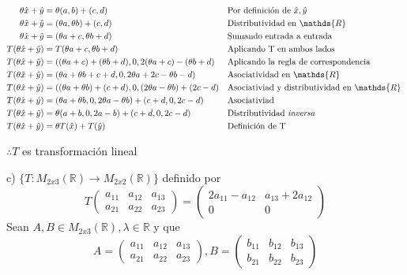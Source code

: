 \documentclass[letterpaper]{article}
\newcommand{\R}{\mathds{R}}
\renewcommand{\*}{\cdot}
\theoremstyle{definition}
\begin{document}
	\begin{align*}
		\theta \hat{x} + \hat{y} &= \theta(a,b) + (c,d) &&\text{Por definición de $ \hat{x}, \hat{y} $}\\
		\theta \hat{x} + \hat{y} &= (\theta a,\theta b) + (c,d) &&\text{Distributividad en $ \R $ }\\
		\theta \hat{x} + \hat{y} &= (\theta a + c,\theta b + d) &&\text{Sumando entrada a entrada }\\
		T(\theta \hat{x} + \hat{y}) &= T(\theta a + c,\theta b + d) &&\text{Aplicando T en ambos lados }\\
		T(\theta \hat{x} + \hat{y}) &= ((\theta a + c) + (\theta b + d), 0, 2(\theta a + c) - (\theta b + d) &&\text{Aplicando la regla de correspondencia }\\
		T(\theta \hat{x} + \hat{y}) &= (\theta a +\theta b + c + d, 0, 2\theta a + 2c - \theta b - d) &&\text{Asociatividad en $ \R $ }\\
		T(\theta \hat{x} + \hat{y}) &= ((\theta a +\theta b) + (c + d), 0, (2\theta a - \theta b) + (2c - d) &&\text{Asociativiad y distributividad en $ \R $ }\\
		T(\theta \hat{x} + \hat{y}) &=  (\theta a +\theta b, 0, 2\theta a - \theta b) + (c + d, 0, 2c - d) &&\text{Asociativiad}\\
		T(\theta \hat{x} + \hat{y}) &=  \theta(a +b, 0, 2a - b) + (c + d, 0, 2c - d) &&\text{Distributividad \textit{inversa}}\\
		T(\theta \hat{x} + \hat{y}) &=  \theta T(\hat{x}) + T(\hat{y}) &&\text{Definición de T}
	\end{align*}
	\begin{center}
		$ \therefore T $ es transformación lineal
	\end{center}	
		

	c) $\lbrace T: M_{2x3}(\mathbb{R}) \longrightarrow M_{2x2}(\mathbb{R}) \rbrace $ definido por
	\[ T \begin{pmatrix} a_{11} & a_{12} & a_{13} \\ a_{21} & a_{22} & a_{23} \end{pmatrix} = \begin{pmatrix} 2a_{11} - a_{12} & a_{13} + 2a_{12} \\ 0 & 0 \end{pmatrix} \]
	Sean $ A,B \in  M_{2x3}(\mathbb{R}), \lambda \in \R $ y que 
	\[ A = \begin{pmatrix}
		a_{11} & a_{12} & a_{13}\\
		a_{21} & a_{22} & a_{23}
	\end{pmatrix}, B = \begin{pmatrix}
		b_{11} & b_{12} & b_{13}\\
		b_{21} & b_{22} & b_{23}
	\end{pmatrix} \]
	
\end{document}
